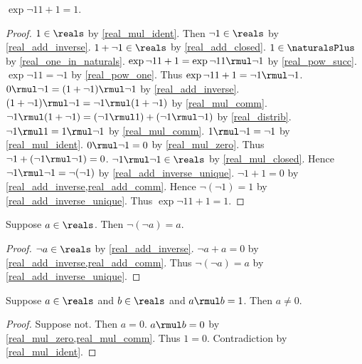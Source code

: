 \begin{theorem}\label{real_neg_one_square}
    $\exp{\neg{1}}{1+1} = 1$.
\end{theorem}
\begin{proof}
    $1\in\reals$ by \cref{real_mul_ident}.
    Then $\neg{1}\in\reals$ by \cref{real_add_inverse}.
    $1 + \neg{1}\in\reals$ by \cref{real_add_closed}.
    $1\in\naturalsPlus$ by \cref{real_one_in_naturals}.
    $\exp{\neg{1}}{1+1} = \exp{\neg{1}}{1} \rmul \neg{1}$ by \cref{real_pow_succ}.
    $\exp{\neg{1}}{1} = \neg{1}$ by \cref{real_pow_one}.
    Thus $\exp{\neg{1}}{1+1} = \neg{1} \rmul \neg{1}$.
    $0 \rmul \neg{1} = (1 + \neg{1}) \rmul \neg{1}$ by \cref{real_add_inverse}.
    $(1 + \neg{1}) \rmul \neg{1} = \neg{1} \rmul (1 + \neg{1})$ by \cref{real_mul_comm}.
    $\neg{1} \rmul (1 + \neg{1}) = (\neg{1} \rmul 1) + (\neg{1} \rmul \neg{1})$ by \cref{real_distrib}.
    $\neg{1} \rmul 1 = 1 \rmul \neg{1}$ by \cref{real_mul_comm}.
    $1 \rmul \neg{1} = \neg{1}$ by \cref{real_mul_ident}.
    $0 \rmul \neg{1} = 0$ by \cref{real_mul_zero}.
    Thus $\neg{1} + (\neg{1} \rmul \neg{1}) = 0$.
    $\neg{1} \rmul \neg{1}\in\reals$ by \cref{real_mul_closed}.
    Hence $\neg{1} \rmul \neg{1} = \neg{(\neg{1})}$ by \cref{real_add_inverse_unique}.
    $\neg{1} + 1 = 0$ by \cref{real_add_inverse,real_add_comm}.
    Hence $\neg{(\neg{1})} = 1$ by \cref{real_add_inverse_unique}.
    Thus $\exp{\neg{1}}{1+1} = 1$.
\end{proof}

\begin{theorem}\label{real_neg_neg}
    Suppose $a\in\reals$.
    Then $\neg{(\neg{a})} = a$.
\end{theorem}
\begin{proof}
    $\neg{a}\in\reals$ by \cref{real_add_inverse}.
    $\neg{a} + a = 0$ by \cref{real_add_inverse,real_add_comm}.
    Thus $\neg{(\neg{a})} = a$ by \cref{real_add_inverse_unique}.
\end{proof}

\begin{lemma}\label{real_mul_unit_left_nonzero}
    Suppose $a\in\reals$ and $b\in\reals$ and $a \rmul b = 1$.
    Then $a \neq 0$.
\end{lemma}
\begin{proof}
    Suppose not.
    Then $a = 0$.
    $a \rmul b = 0$ by \cref{real_mul_zero,real_mul_comm}.
    Thus $1 = 0$.
    Contradiction by \cref{real_mul_ident}.
\end{proof}

